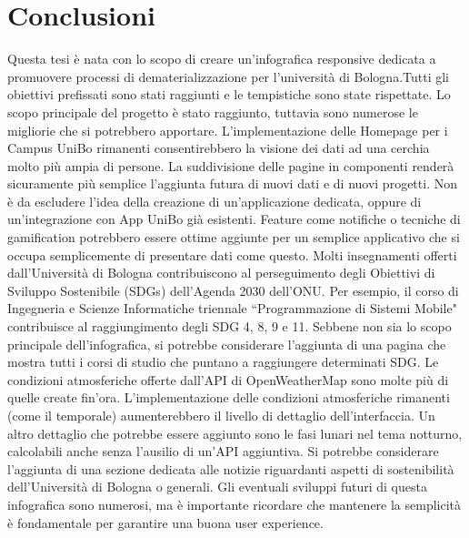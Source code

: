\clearpage{\pagestyle{empty}\cleardoublepage}
\chapter*{Conclusioni}
\noindent 
Questa tesi è nata con lo scopo di creare un'infografica responsive dedicata a promuovere processi di dematerializzazione per l'università di Bologna.\newline Tutti gli obiettivi prefissati sono stati raggiunti e le tempistiche sono state rispettate. Lo scopo principale del progetto è stato raggiunto, tuttavia sono numerose le migliorie che si potrebbero apportare.\newline
L'implementazione delle Homepage per i Campus UniBo rimanenti consentirebbero la visione dei dati ad una cerchia molto più ampia di persone.\newline
La suddivisione delle pagine in componenti renderà sicuramente più semplice l'aggiunta futura di nuovi dati e di nuovi progetti.
Non è da escludere l'idea della creazione di un'applicazione dedicata, oppure di un'integrazione con App UniBo già esistenti.\newline
Feature come notifiche o tecniche di gamification potrebbero essere ottime aggiunte per un semplice applicativo che si occupa semplicemente di presentare dati come questo.\newline
Molti insegnamenti offerti dall'Università di Bologna contribuiscono al perseguimento degli Obiettivi di Sviluppo Sostenibile (SDGs) dell'Agenda 2030 dell'ONU.
Per esempio, il corso di Ingegneria e Scienze Informatiche triennale ``Programmazione di Sistemi Mobile"  contribuisce al raggiungimento degli SDG 4, 8, 9 e 11.
Sebbene non sia lo scopo principale dell'infografica, si potrebbe considerare l'aggiunta di una pagina che mostra tutti i corsi di studio che puntano a raggiungere determinati SDG.\newline
Le condizioni atmosferiche offerte dall'API di OpenWeatherMap sono molte più di quelle create fin'ora. L'implementazione delle condizioni atmosferiche rimanenti (come il temporale) aumenterebbero il livello di dettaglio dell'interfaccia.\newline
Un altro dettaglio che potrebbe essere aggiunto sono le fasi lunari nel tema notturno, calcolabili anche senza l'ausilio di un'API aggiuntiva.
Si potrebbe considerare l'aggiunta di una sezione dedicata alle notizie riguardanti aspetti di sostenibilità dell'Università di Bologna o generali.\newline
Gli eventuali sviluppi futuri di questa infografica sono numerosi, ma è importante ricordare che mantenere la semplicità è fondamentale per garantire una buona user experience.
